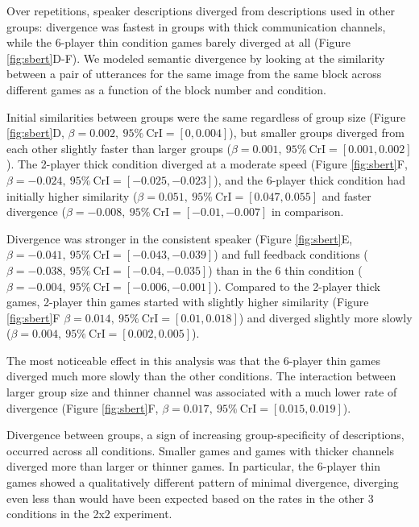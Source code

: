 \documentclass[
  english,
  a4paper,
]{article}
\begin{document}
Over repetitions, speaker descriptions diverged from descriptions used in other groups: divergence was fastest in groups with thick communication channels, while the 6-player thin condition games barely diverged at all (Figure \ref{fig:sbert}D-F). We modeled semantic divergence by looking at the similarity between a pair of utterances for the same image from the same block across different games as a function of the block number and condition.

Initial similarities between groups were the same regardless of group size (Figure \ref{fig:sbert}D, \(\beta=0.002,\:95\%\:\mathrm{CrI}=[0, 0.004]\)), but smaller groups diverged from each other slightly faster than larger groups (\(\beta=0.001,\:95\%\:\mathrm{CrI}=[0.001, 0.002]\)). The 2-player thick condition diverged at a moderate speed (Figure \ref{fig:sbert}F, \(\beta=-0.024,\:95\%\:\mathrm{CrI}=[-0.025, -0.023]\)), and the 6-player thick condition had initially higher similarity (\(\beta=0.051,\:95\%\:\mathrm{CrI}=[0.047, 0.055]\) and faster divergence (\(\beta=-0.008,\:95\%\:\mathrm{CrI}=[-0.01, -0.007]\) in comparison.

Divergence was stronger in the consistent speaker (Figure \ref{fig:sbert}E, \(\beta=-0.041,\:95\%\:\mathrm{CrI}=[-0.043, -0.039]\)) and full feedback conditions ( \(\beta=-0.038,\:95\%\:\mathrm{CrI}=[-0.04, -0.035]\)) than in the 6 thin condition ( \(\beta=-0.004,\:95\%\:\mathrm{CrI}=[-0.006, -0.001]\)). Compared to the 2-player thick games, 2-player thin games started with slightly higher similarity (Figure \ref{fig:sbert}F \(\beta=0.014,\:95\%\:\mathrm{CrI}=[0.01, 0.018]\)) and diverged slightly more slowly (\(\beta=0.004,\:95\%\:\mathrm{CrI}=[0.002, 0.005]\)).

The most noticeable effect in this analysis was that the 6-player thin games diverged much more slowly than the other conditions. The interaction between larger group size and thinner channel was associated with a much lower rate of divergence (Figure \ref{fig:sbert}F, \(\beta=0.017,\:95\%\:\mathrm{CrI}=[0.015, 0.019]\)).

Divergence between groups, a sign of increasing group-specificity of descriptions, occurred across all conditions. Smaller games and games with thicker channels diverged more than larger or thinner games. In particular, the 6-player thin games showed a qualitatively different pattern of minimal divergence, diverging even less than would have been expected based on the rates in the other 3 conditions in the 2x2 experiment.
\end{document}
